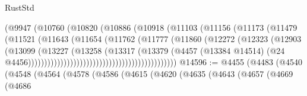 \begin{lexlean}{RustStd}
\begin{coremodule}
                                              (@9947
                                                (@10760
                                                  (@10820
                                                    (@10886
                                                      (@10918
                                                        (@11103
                                                          (@11156
                                                            (@11173
                                                              (@11479
                                                                (@11521
                                                                  (@11643
                                                                    (@11654
                                                                      (@11762
                                                                        (@11777
                                                                          (@11860
                                                                            (@12272
                                                                              (@12323
                                                                                (@12903
                                                                                  (@13099
                                                                                    (@13227
                                                                                      (@13258
                                                                                        (@13317
                                                                                          (@13379
                                                                                            (@4457
                                                                                              (@13384
                                                                                                @14514)
                                                                                              (@24
                                                                                                @4456))))))))))))))))))))))))))))))))))))))))))))))
@14596 := @4455
    (@4483
      (@4540
        (@4548
          (@4564
            (@4578
              (@4586
                (@4615
                  (@4620
                    (@4635
                      (@4643
                        (@4657
                          (@4669
                            (@4686

\end{coremodule}
\end{lexlean}
